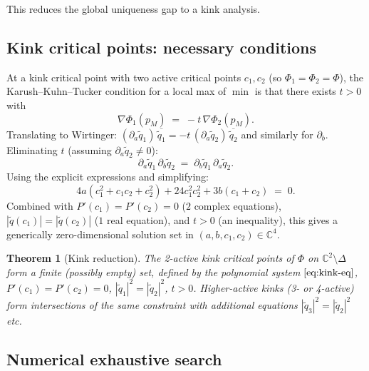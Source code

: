 \documentclass[11pt,a4paper]{article}
\newtheorem{theorem}{Theorem}[section]
\begin{document}
This reduces the global uniqueness gap to a kink analysis.

\subsection{Kink critical points: necessary conditions}

At a kink critical point with two active critical points $c_1, c_2$
(so $\Phi_1=\Phi_2=\Phi$), the Karush--Kuhn--Tucker condition for a
local max of $\min$ is that there exists $t>0$ with
\begin{equation}
\nabla\Phi_1(p_M) \;=\; -t\,\nabla\Phi_2(p_M).
\label{eq:KKT}
\end{equation}
Translating to Wirtinger:
$(\partial_a\widetilde q_1)\,\overline{\widetilde q_1} =
-t\,(\partial_a\widetilde q_2)\,\overline{\widetilde q_2}$
and similarly for $\partial_b$. Eliminating $t$ (assuming
$\partial_a\widetilde q_2\neq 0$):
\begin{equation}
\partial_a\widetilde q_1\,\partial_b\widetilde q_2
\;=\;
\partial_b\widetilde q_1\,\partial_a\widetilde q_2.
\label{eq:kink-elim}
\end{equation}
Using the explicit expressions and simplifying:
\begin{equation}
\boxed{\;
4 a (c_1^2 + c_1 c_2 + c_2^2) + 24 c_1^2 c_2^2 + 3 b (c_1 + c_2) \;=\; 0.
\;}
\label{eq:kink-eq}
\end{equation}
Combined with $P'(c_1)=P'(c_2)=0$ ($2$ complex equations),
$|\widetilde q(c_1)| = |\widetilde q(c_2)|$ ($1$ real equation),
and $t>0$ (an inequality), this gives a generically zero-dimensional
solution set in $(a,b,c_1,c_2)\in\mathbb{C}^4$.

\begin{theorem}[Kink reduction]\label{thm:kink-reduction}
The 2-active kink critical points of $\Phi$ on $\mathbb{C}^2\setminus
\Delta$ form a finite (possibly empty) set, defined by the polynomial
system $\eqref{eq:kink-eq}$, $P'(c_1)=P'(c_2)=0$, $|\widetilde q_1|^2
=|\widetilde q_2|^2$, $t>0$. Higher-active kinks (3- or 4-active) form
intersections of the same constraint with additional equations
$|\widetilde q_3|^2=|\widetilde q_2|^2$ etc.
\end{theorem}

\subsection{Numerical exhaustive search}
\end{document}
